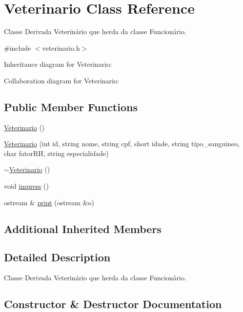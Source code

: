 \hypertarget{classVeterinario}{}\section{Veterinario Class Reference}
\label{classVeterinario}


Classe Derivada Veterinário que herda da classe Funcionário.  




{\ttfamily \#include $<$veterinario.\+h$>$}



Inheritance diagram for Veterinario\+:


Collaboration diagram for Veterinario\+:
\subsection*{Public Member Functions}
\begin{DoxyCompactItemize}
\item 
\hyperlink{classVeterinario_af8dc5f6f77bf8c70dd94d54766764134}{Veterinario} ()
\item 
\hyperlink{classVeterinario_aca44aaf2acc5bb63ceb85a2a5b8be3ab}{Veterinario} (int id, string nome, string cpf, short idade, string tipo\+\_\+sanguineo, char fator\+RH, string especialidade)
\item 
\hyperlink{classVeterinario_a0de805e30bc7006d2035458f80c18671}{$\sim$\+Veterinario} ()
\item 
void \hyperlink{classVeterinario_af46d22c41b2103062ad598ad4b97dda3}{impress} ()
\item 
ostream \& \hyperlink{classVeterinario_a2226579fc4858f2a6d7c7d1efe739b2a}{print} (ostream \&o)
\end{DoxyCompactItemize}
\subsection*{Additional Inherited Members}


\subsection{Detailed Description}
Classe Derivada Veterinário que herda da classe Funcionário. 

\subsection{Constructor \& Destructor Documentation}
